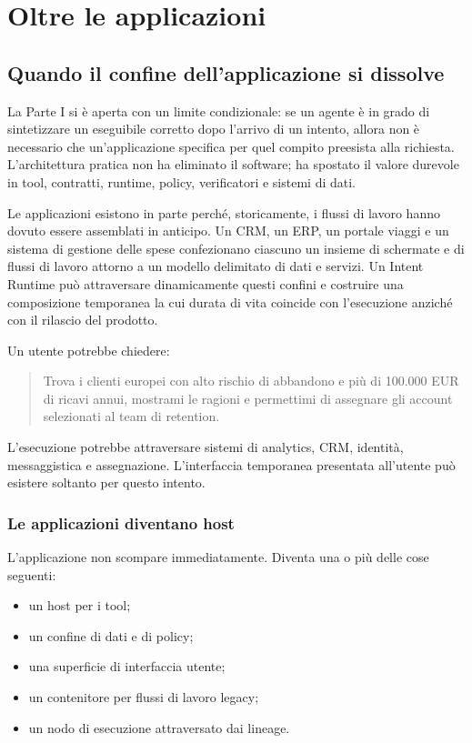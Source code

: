 \documentclass[10pt,oneside,openany]{book}
\begin{document}
\part{Oltre le applicazioni}

\chapter{Quando il confine dell'applicazione si dissolve}

La Parte I si è aperta con un limite condizionale: se un agente è in grado di sintetizzare un eseguibile corretto dopo l'arrivo di un intento, allora non è necessario che un'applicazione specifica per quel compito preesista alla richiesta. L'architettura pratica non ha eliminato il software; ha spostato il valore durevole in tool, contratti, runtime, policy, verificatori e sistemi di dati.

Le applicazioni esistono in parte perché, storicamente, i flussi di lavoro hanno dovuto essere assemblati in anticipo. Un CRM, un ERP, un portale viaggi e un sistema di gestione delle spese confezionano ciascuno un insieme di schermate e di flussi di lavoro attorno a un modello delimitato di dati e servizi. Un Intent Runtime può attraversare dinamicamente questi confini e costruire una composizione temporanea la cui durata di vita coincide con l'esecuzione anziché con il rilascio del prodotto.

Un utente potrebbe chiedere:

\begin{quote}
Trova i clienti europei con alto rischio di abbandono e più di 100.000 EUR di ricavi annui, mostrami le ragioni e permettimi di assegnare gli account selezionati al team di retention.
\end{quote}

L'esecuzione potrebbe attraversare sistemi di analytics, CRM, identità, messaggistica e assegnazione. L'interfaccia temporanea presentata all'utente può esistere soltanto per questo intento.

\section{Le applicazioni diventano host}
L'applicazione non scompare immediatamente. Diventa una o più delle cose seguenti:

\begin{itemize}
\item un host per i tool;
\item un confine di dati e di policy;
\item una superficie di interfaccia utente;
\item un contenitore per flussi di lavoro legacy;
\item un nodo di esecuzione attraversato dai lineage.
\end{itemize}
\end{document}
